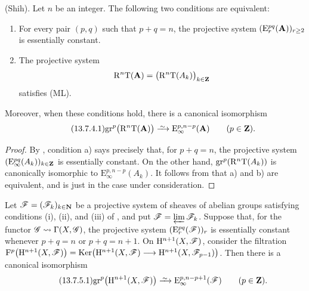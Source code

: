 \begin{proposition}[13.7.4]
\label{0.13.7.4}
(Shih).
Let $n$ be an integer.
The following two conditions are equivalent:
\begin{enumerate}
  \item[{\rm a)}] For every pair $(p,q)$ such that $p+q=n$, the
  projective system
  $(\mathrm{E}_r^{pq}(\mathbf{A}))_{r\geq2}$ is essentially constant.
  \item[{\rm b)}] The projective system
  \[
    \mathrm{R}^n\mathrm{T}(\mathbf{A})
    =
    \bigl(\mathrm{R}^n\mathrm{T}(A_k)\bigr)_{k\in\mathbf{Z}}
  \]
  satisfies {\rm(ML)}.
\end{enumerate}
Moreover, when these conditions hold, there is a canonical
isomorphism
\begin{equation}
\label{0.13.7.4.1}
\tag{13.7.4.1}
  \mathrm{gr}^p\bigl(\RR^n\mathrm{T}(\bb{A})\bigr)
  \isoto
  \mathrm{E}_\infty^{p,n-p}(\bb{A})
  \qquad(p\in\bb{Z}).
\end{equation}
\end{proposition}

\begin{proof}
By , condition {\rm a)} says precisely that, for
$p+q=n$, the projective system
$(\mathrm{E}_\infty^{pq}(A_k))_{k\in\mathbf{Z}}$ is essentially
constant.
On the other hand,
$\mathrm{gr}^p(\mathrm{R}^n\mathrm{T}(A_k))$ is canonically isomorphic to
$\mathrm{E}_\infty^{p,n-p}(A_k)$.
It follows from  that {\rm a)} and {\rm b)} are
equivalent, and  is just
 in the case under consideration.
\end{proof}

\begin{corollary}[13.7.5]
\label{0.13.7.5}
Let $\boldsymbol{\mathscr{F}}=(\mathscr{F}_k)_{k\in\mathbf{N}}$ be a projective system of
sheaves of abelian groups satisfying conditions {\rm(i)}, {\rm(ii)},
and {\rm(iii)} of , and put
$\mathscr{F}=\varprojlim\mathscr{F}_k$.
Suppose that, for the functor
$\mathscr{G}\leadsto\Gamma(X,\mathscr{G})$, the projective system
$(\mathrm{E}_r^{pq}(\boldsymbol{\mathscr{F}}))_r$ is essentially constant whenever
$p+q=n$ or $p+q=n+1$.
On $\mathrm{H}^{n+1}(X,\mathscr{F})$, consider the filtration $\mathrm{F}^p\bigl(\mathrm{H}^{n+1}(X,\mathscr{F})\bigr)
=
\operatorname{Ker}\bigl(
\mathrm{H}^{n+1}(X,\mathscr{F})
\longrightarrow
\mathrm{H}^{n+1}(X,\mathscr{F}_{p-1})
\bigr)$.
Then there is a canonical isomorphism
\begin{equation}
\label{0.13.7.5.1}
\tag{13.7.5.1}
  \mathrm{gr}^p\bigl(\HH^{n+1}(X,\sh{F})\bigr)
  \isoto
  \mathrm{E}_\infty^{p,n-p+1}(\boldsymbol{\sh{F}})
  \qquad(p\in\bb{Z}).
\end{equation}
\end{corollary}

